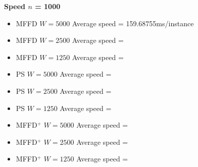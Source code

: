 \documentclass[oribibl]{llncs}
\begin{document}
\textbf{Speed $n$ = 1000}
\begin{itemize}
	\item MFFD $W = 5000$ Average speed = 159.68755ms/instance
	\item MFFD $W = 2500$ Average speed = 
	\item MFFD $W = 1250$ Average speed = 
	\item PS $W = 5000$ Average speed = 
	\item PS $W = 2500$ Average speed = 
	\item PS $W = 1250$ Average speed = 
	\item MFFD$^+$ $W = 5000$ Average speed = 
	\item MFFD$^+$ $W = 2500$ Average speed = 
	\item MFFD$^+$ $W = 1250$ Average speed = 
\end{itemize}






\end{document}
